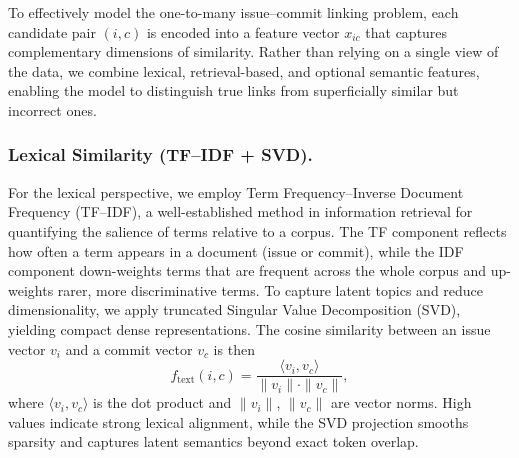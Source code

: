 
To effectively model the one-to-many issue--commit linking problem, each candidate pair $(i,c)$ is encoded into a feature vector $x_{ic}$ that captures complementary dimensions of similarity. Rather than relying on a single view of the data, we combine lexical, retrieval-based, and optional semantic features, enabling the model to distinguish true links from superficially similar but incorrect ones. 

\subsubsection{Lexical Similarity (TF--IDF + SVD).}
For the lexical perspective, we employ Term Frequency--Inverse Document Frequency (TF--IDF), a well-established method in information retrieval for quantifying the salience of terms relative to a corpus. The TF component reflects how often a term appears in a document (issue or commit), while the IDF component down-weights terms that are frequent across the whole corpus and up-weights rarer, more discriminative terms. To capture latent topics and reduce dimensionality, we apply truncated Singular Value Decomposition (SVD), yielding compact dense representations. The cosine similarity between an issue vector $v_i$ and a commit vector $v_c$ is then
\[
f_{\text{text}}(i,c) = \frac{\langle v_i, v_c \rangle}{\|v_i\|\cdot \|v_c\|},
\]
where $\langle v_i, v_c \rangle$ is the dot product and $\|v_i\|$, $\|v_c\|$ are vector norms. High values indicate strong lexical alignment, while the SVD projection smooths sparsity and captures latent semantics beyond exact token overlap.

